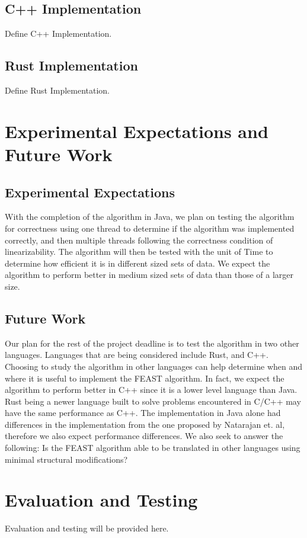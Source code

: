 \documentclass[conference]{IEEEtran}
\begin{document}
\subsection{C++ Implementation}\label{AA}
Define C++ Implementation.

\subsection{Rust Implementation}\label{AA}
Define Rust Implementation.

\section{Experimental Expectations and Future Work }
\subsection{Experimental Expectations}\label{AA}
With the completion of the algorithm in Java, we plan on testing the algorithm for correctness using one thread to determine if the algorithm was implemented correctly, and then multiple threads following the correctness condition of linearizability. The algorithm will then be tested with the unit of Time to determine how efficient it is in different sized sets of data. We expect the algorithm to perform better in medium sized sets of data than those of a larger size. 

\subsection{Future Work}\label{AA}
Our plan for the rest of the project deadline is to test the algorithm in two other languages. Languages that are being considered include Rust, and C++. Choosing to study the algorithm in other languages can help determine when and where it is useful to implement the FEAST algorithm. In fact, we expect the algorithm to perform better in C++ since it is a lower level language than Java. Rust being a newer language built to solve problems encountered in C/C++ may have the same performance as C++. The implementation in Java alone had differences in the implementation from the one proposed by Natarajan et. al, therefore we also expect performance differences. We also seek to answer the following: Is the FEAST algorithm able to be translated in other languages using minimal structural modifications? 

\section{Evaluation and Testing}
Evaluation and testing will be provided here.
\end{document}
